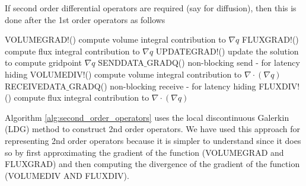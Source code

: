 \documentclass{article}
\begin{document}
If second order differential operators are required (say for diffusion), then this is done after the 1st order operators as follows
\begin{algorithm}
\label{alg:second_order_operators}
\begin{algorithmic}
\State VOLUMEGRAD!() \Comment compute volume integral contribution to $\nabla q$
\State FLUXGRAD!() \Comment compute flux integral contribution to $\nabla q$
\State UPDATEGRAD!() \Comment update the solution to compute gridpoint $\nabla q$
\State SENDDATA$\_$GRADQ() \Comment non-blocking send - for latency hiding
\State VOLUMEDIV!() \Comment compute volume integral contribution to $\nabla \cdot (\nabla q)$
\State RECEIVEDATA$\_$GRADQ() \Comment non-blocking receive - for latency hiding
\State FLUXDIV!() \Comment compute flux integral contribution to $\nabla \cdot (\nabla q)$
\EndFunction
\end{algorithmic}
\end{algorithm}
Algorithm \ref{alg:second_order_operators} uses the local discontinuous Galerkin (LDG) method to construct 2nd order operators. We have used this approach for representing 2nd order operators because it is simpler to understand since it does so by first approximating the gradient of the function (VOLUMEGRAD and FLUXGRAD) and then computing the divergence of the gradient of the function (VOLUMEDIV AND FLUXDIV).  



\end{document}
